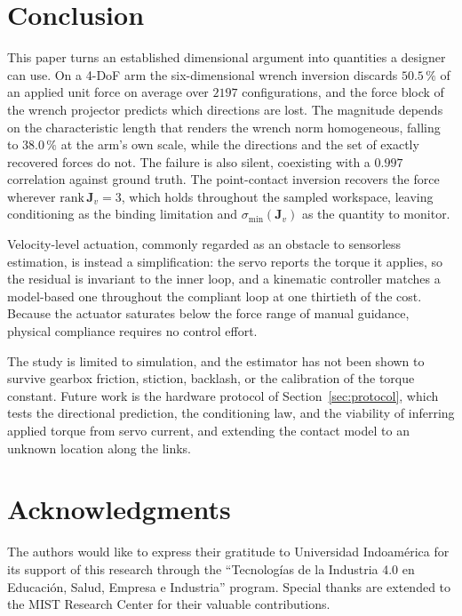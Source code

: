 \documentclass{ieeeaccess}
\newcommand{\Jv}{\bm{J}_{\!v}}
\begin{document}
\section{Conclusion}
\label{sec:conclusion}

This paper turns an established dimensional argument into quantities a designer
can use. On a 4-DoF arm the six-dimensional wrench inversion discards $50.5\,\%$
of an applied unit force on average over $2197$ configurations, and the force
block of the wrench projector predicts which directions are lost. The magnitude
depends on the characteristic length that renders the wrench norm homogeneous,
falling to $38.0\,\%$ at the arm's own scale, while the directions and the set of
exactly recovered forces do not. The failure is also silent, coexisting with a
$0.997$ correlation against ground truth. The point-contact inversion recovers the
force wherever $\mathrm{rank}\,\Jv=3$, which holds throughout the sampled
workspace, leaving conditioning as the binding limitation and
$\sigma_{\min}(\Jv)$ as the quantity to monitor.

Velocity-level actuation, commonly regarded as an obstacle to sensorless
estimation, is instead a simplification: the servo reports the torque it applies,
so the residual is invariant to the inner loop, and a kinematic controller matches
a model-based one throughout the compliant loop at one thirtieth of the cost.
Because the actuator saturates below the force range of manual guidance, physical
compliance requires no control effort.

The study is limited to simulation, and the estimator has not been shown to
survive gearbox friction, stiction, backlash, or the calibration of the torque
constant. Future work is the hardware protocol of Section~\ref{sec:protocol},
which tests the directional prediction, the conditioning law, and the viability of
inferring applied torque from servo current, and extending the contact model to an
unknown location along the links.

\section*{Acknowledgments}
The authors would like to express their gratitude to Universidad Indoam\'erica for
its support of this research through the ``Tecnolog\'ias de la Industria 4.0 en
Educaci\'on, Salud, Empresa e Industria'' program. Special thanks are extended to
the MIST Research Center for their valuable contributions.
\end{document}
